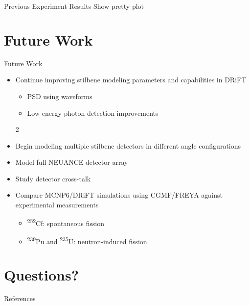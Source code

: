 \documentclass{beamer}
\begin{document}
\begin{frame}{Previous Experiment Results}
Show pretty plot
\end{frame}

\section{Future Work}
\begin{frame}
\sectionpage
\end{frame}

\begin{frame}{Future Work}
\begin{itemize}
\item Continue improving stilbene modeling parameters and capabilities in DRiFT
\begin{itemize}
\item PSD using waveforms
\item Low-energy photon detection improvements 
\end{itemize}2
\item Begin modeling multiple stilbene detectors in different angle configurations
\item Model full NEUANCE detector array
\item Study detector cross-talk
\item Compare MCNP6/DRiFT simulations using CGMF/FREYA against experimental measurements
\begin{itemize}
\item \textsuperscript{252}Cf: spontaneous fission
\item \textsuperscript{239}Pu and \textsuperscript{235}U: neutron-induced fission
\end{itemize}
\end{itemize}
\end{frame}

\appendix
\section{Questions?}
\begin{frame}
\sectionpage
\end{frame}

\begin{frame}[allowframebreaks]{References}
\def\newblock{}
\nocite{*}
\scriptsize{}

\end{frame}
\end{document}

